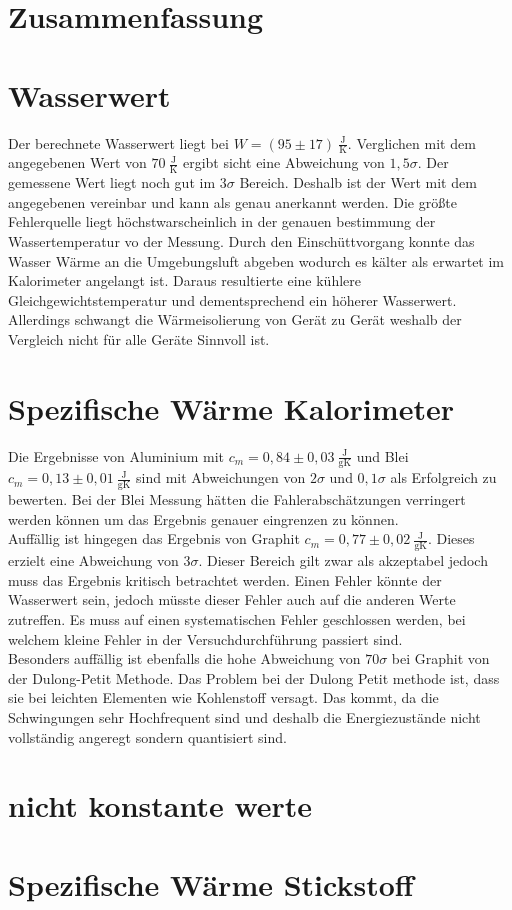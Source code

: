 \section{Zusammenfassung}



\section{Wasserwert}

Der berechnete Wasserwert liegt bei $\boxed{W= ( 95 \pm  17)\ \tfrac{\text{J}}{\text{K}}}$.
Verglichen mit dem angegebenen Wert von $70\ \tfrac{\text{J}}{\text{K}}$ ergibt sicht eine Abweichung
von $1,5 \sigma$. Der gemessene Wert liegt noch gut im $3\sigma$ Bereich. Deshalb ist der Wert mit
dem angegebenen vereinbar und kann als genau anerkannt werden.
Die größte Fehlerquelle liegt höchstwarscheinlich in der genauen bestimmung der Wassertemperatur vo der Messung.
Durch den Einschüttvorgang konnte das Wasser Wärme an die Umgebungsluft abgeben wodurch es kälter als erwartet im Kalorimeter angelangt ist.
Daraus resultierte eine kühlere Gleichgewichtstemperatur und dementsprechend ein höherer Wasserwert. Allerdings schwangt die Wärmeisolierung von Gerät zu Gerät weshalb der Vergleich nicht für alle Geräte Sinnvoll ist.

\section{Spezifische Wärme Kalorimeter}
Die Ergebnisse von Aluminium mit $\boxed{c_m = 0,84 \pm 0,03\ \tfrac{\text{J}}{\text{gK}}}$ und Blei $\boxed{c_m = 0,13\pm0,01\ \tfrac{\text{J}}{\text{gK}}}$
sind mit Abweichungen von $2\sigma$ und $0,1\sigma$ als Erfolgreich zu bewerten. Bei der Blei Messung
hätten die Fahlerabschätzungen verringert werden können um das Ergebnis genauer eingrenzen zu können.\\
Auffällig ist hingegen das Ergebnis von Graphit  $\boxed{c_m = 0,77\pm0,02\ \tfrac{\text{J}}{\text{gK}}}$. Dieses erzielt eine Abweichung von $3\sigma$.
Dieser Bereich gilt zwar als akzeptabel jedoch muss das Ergebnis kritisch betrachtet werden.
Einen Fehler könnte der Wasserwert sein, jedoch müsste dieser Fehler auch auf die anderen Werte zutreffen.
Es muss auf einen systematischen Fehler geschlossen werden, bei welchem kleine Fehler in der Versuchdurchführung passiert sind.\\
Besonders auffällig ist ebenfalls die hohe Abweichung von $70\sigma$ bei Graphit von der Dulong-Petit Methode.
Das Problem bei der Dulong Petit methode ist, dass sie bei leichten Elementen wie Kohlenstoff versagt. Das kommt, da die
Schwingungen sehr Hochfrequent sind und deshalb die Energiezustände nicht vollständig angeregt sondern quantisiert sind.

\section{nicht konstante werte}

\section{Spezifische Wärme Stickstoff}
